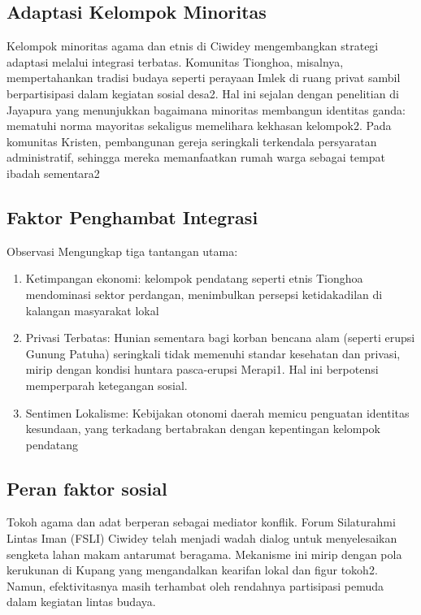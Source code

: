 \documentclass[a4paper,12pt, left=3cm,right=2cm,bottom=2cm, bahasa]{article}
\begin{document}
\subsection{Adaptasi Kelompok Minoritas}
Kelompok minoritas agama dan etnis di Ciwidey mengembangkan strategi adaptasi melalui integrasi terbatas. Komunitas Tionghoa, misalnya, mempertahankan tradisi budaya seperti perayaan Imlek di ruang privat sambil berpartisipasi dalam kegiatan sosial desa2. Hal ini sejalan dengan penelitian di Jayapura yang menunjukkan bagaimana minoritas membangun identitas ganda: mematuhi norma mayoritas sekaligus memelihara kekhasan kelompok2. Pada komunitas Kristen, pembangunan gereja seringkali terkendala persyaratan administratif, sehingga mereka memanfaatkan rumah warga sebagai tempat ibadah sementara2 \cite{Admin:2005}

\subsection{Faktor Penghambat Integrasi}
Observasi Mengungkap tiga tantangan utama:
\begin{enumerate}
  \item Ketimpangan ekonomi: kelompok pendatang seperti etnis Tionghoa mendominasi sektor perdangan, menimbulkan persepsi ketidakadilan di kalangan masyarakat lokal 
  \item Privasi Terbatas: Hunian sementara bagi korban bencana alam (seperti erupsi Gunung Patuha) seringkali tidak memenuhi standar kesehatan dan privasi, mirip dengan kondisi huntara pasca-erupsi Merapi1. Hal ini berpotensi memperparah ketegangan sosial.
  \item Sentimen Lokalisme: Kebijakan otonomi daerah memicu penguatan identitas kesundaan, yang terkadang bertabrakan dengan kepentingan kelompok pendatang
\end{enumerate}

\subsection{Peran faktor sosial}
Tokoh agama dan adat berperan sebagai mediator konflik. Forum Silaturahmi Lintas Iman (FSLI) Ciwidey telah menjadi wadah dialog untuk menyelesaikan sengketa lahan makam antarumat beragama. Mekanisme ini mirip dengan pola kerukunan di Kupang yang mengandalkan kearifan lokal dan figur tokoh2. Namun, efektivitasnya masih terhambat oleh rendahnya partisipasi pemuda dalam kegiatan lintas budaya.
\setcounter{subsection}{0}
\setcounter{section}{3}
\end{document}

